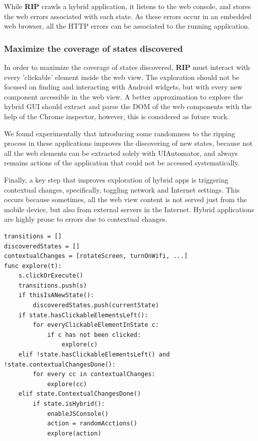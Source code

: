 While \textbf{RIP} crawls a hybrid application, it listens to the web console, and stores the web errors associated with each state. As these errors occur in an embedded web browser, all the HTTP errors can be associated to the running application. %

\subsubsection{Maximize the coverage of states discovered}
In order to maximize the coverage of states discovered, \textbf{RIP} must interact with every 'clickable' element inside the web view. The exploration should not be focused on finding and interacting with Android widgets, but with every new component accessible in the web view. A better approximation to explore the hybrid GUI should extract and parse the DOM of the web components with the help of the Chrome inspector, however, this is considered as future work.

We found experimentally that introducing some randomness to the ripping process in these applications improves the discovering of new states, because not all the web elements can be extracted solely with UIAutomator, and always remains actions of the application that could not be accessed systematically.

Finally, a key step that improves exploration of hybrid apps is triggering contextual changes, specifically, toggling network and Internet settings. This occurs because sometimes, all the web view content is not served just from the mobile device, but also from external servers in the Internet. Hybrid applications are highly prone to errors due to contextual changes.

\begin{lstlisting}[caption={Pseudocode describing the Ripping process},label={pseudocode}]
transitions = []
discoveredStates = []
contextualChanges = [rotateScreen, turnOnWifi, ...]
func explore(t):
	s.clickOrExecute()
	transitions.push(s)
	if thisIsANewState():
		discoveredStates.push(currentState)
	if state.hasClickableElementsLeft():
 		for everyClickableElementInState c:
     		if c has not been clicked:
         		explore(c)
 	elif !state.hasClickableElementsLeft() and !state.contextualChangesDone():
 		for every cc in contextualChanges:
 			explore(cc)
 	elif state.ContextualChangesDone()
 		if state.isHybrid():
 		 	enableJSConsole()
 			action = randomAcctions()
 			explore(action)

\end{lstlisting}

